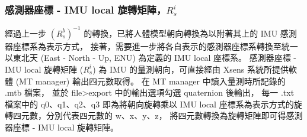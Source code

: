 
\subsubsection{感測器座標 - IMU local 旋轉矩陣，$R^i_s$}
經過上一步 $(R^b_s)^{-1}$ 的轉換，已將人體模型朝向轉換為以附著其上的 IMU 感測器座標系為表示方式，
接著，需要進一步將各自表示的感測器座標系轉換至統一以東北天 (East - North - Up, ENU) 為定義的 IMU local 座標系。
感測器座標 - IMU local 旋轉矩陣 ($R^i_s$) 為 IMU 的量測朝向，可直接經由 Xsens 系統所提供軟體 (MT manager) 輸出四元數取得。
在 MT manager 中讀入量測時所記錄的 .mtb 檔案，
並於 file>export 中的輸出選項勾選 quaternion 後輸出，
每一 .txt 檔案中的 q0、q1、q2、q3 即為將朝向旋轉乘以 IMU local 座標系為表示方式的旋轉四元數，分別代表四元數的 w、x、y、z，
將四元數轉換為旋轉矩陣即可得感測器座標 - IMU local 旋轉矩陣。

